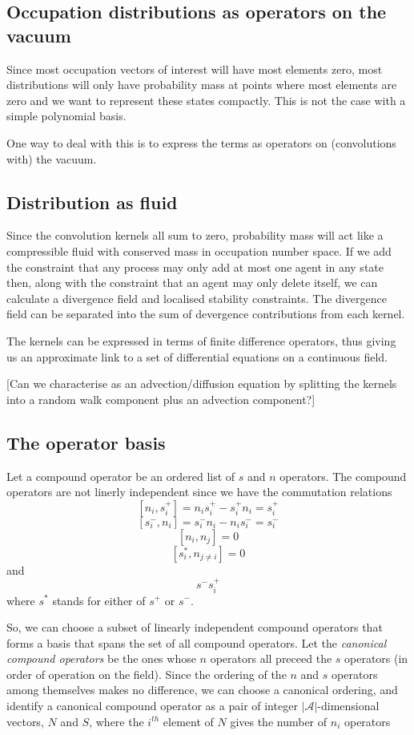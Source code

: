\documentclass[a4paper]{article}
\begin{document}
\subsection{Occupation distributions as operators on the vacuum}
Since most occupation vectors of interest will have most elements zero, most distributions will only have probability mass at points where most elements are zero and we want to represent these states compactly. This is not the case with a simple polynomial basis.

One way to deal with this is to express the terms as operators on (convolutions with) the vacuum.

\subsection{Distribution as fluid}
Since the convolution kernels all sum to zero, probability mass will act like a compressible fluid with conserved mass in occupation number space. If we add the constraint that any process may only add at most one agent in any state then, along with the constraint that an agent may only delete itself, we can calculate a divergence field and localised stability constraints. The divergence field can be separated into the sum of devergence contributions from each kernel.

The kernels can be expressed in terms of finite difference operators, thus giving us an approximate link to a set of differential equations on a continuous field.

[Can we characterise as an advection/diffusion equation by splitting the kernels into a random walk component plus an advection component?]


\subsection{The operator basis}

Let a compound operator be an ordered list of $s$ and $n$ operators. The compound operators are not linerly independent since we have the commutation relations
\[
[n_i,s^+_i] = n_i s^+_i - s^+_i n_i = s^+_i  
\]
\[
[s^-_i, n_i] = s^-_i n_i - n_i s^-_i = s^-_i  
\]
\[
[n_i, n_j] = 0
\]
\[
[s^*_i, n_{j \ne i}] = 0
\]
and
\[
s^-s^+_i
\]
where $s^*$ stands for either of $s^+$ or $s^-$.

So, we can choose a subset of linearly independent compound operators that forms a basis that spans the set of all compound operators. Let the \textit{canonical compound operators} be the ones whose $n$ operators all preceed the $s$ operators (in order of operation on the field). Since the ordering of the $n$ and $s$ operators among themselves makes no difference, we can choose a canonical ordering, and identify a canonical compound operator as a pair of integer $|\mathcal{A}|$-dimensional vectors, $N$ and $S$, where the $i^{th}$ element of $N$ gives the number of $n_i$ operators
\end{document}
